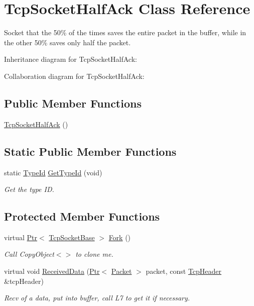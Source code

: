 \hypertarget{classTcpSocketHalfAck}{}\section{Tcp\+Socket\+Half\+Ack Class Reference}
\label{classTcpSocketHalfAck}


Socket that the 50\% of the times saves the entire packet in the buffer, while in the other 50\% saves only half the packet.  




Inheritance diagram for Tcp\+Socket\+Half\+Ack\+:


Collaboration diagram for Tcp\+Socket\+Half\+Ack\+:
\subsection*{Public Member Functions}
\begin{DoxyCompactItemize}
\item 
\hyperlink{classTcpSocketHalfAck_ae8504a66995a30f473d3049ad3cf8298}{Tcp\+Socket\+Half\+Ack} ()
\end{DoxyCompactItemize}
\subsection*{Static Public Member Functions}
\begin{DoxyCompactItemize}
\item 
static \hyperlink{classns3_1_1TypeId}{Type\+Id} \hyperlink{classTcpSocketHalfAck_a718d9cb58addc79c2018f768c4f464e9}{Get\+Type\+Id} (void)
\begin{DoxyCompactList}\small\item\em Get the type ID. \end{DoxyCompactList}\end{DoxyCompactItemize}
\subsection*{Protected Member Functions}
\begin{DoxyCompactItemize}
\item 
virtual \hyperlink{classns3_1_1Ptr}{Ptr}$<$ \hyperlink{classns3_1_1TcpSocketBase}{Tcp\+Socket\+Base} $>$ \hyperlink{classTcpSocketHalfAck_acae86abb1337213c04565efff8f239bd}{Fork} ()
\begin{DoxyCompactList}\small\item\em Call Copy\+Object$<$$>$ to clone me. \end{DoxyCompactList}\item 
virtual void \hyperlink{classTcpSocketHalfAck_af7e6040b891ce8b8abd0f774a366fa90}{Received\+Data} (\hyperlink{classns3_1_1Ptr}{Ptr}$<$ \hyperlink{classns3_1_1Packet}{Packet} $>$ packet, const \hyperlink{classns3_1_1TcpHeader}{Tcp\+Header} \&tcp\+Header)
\begin{DoxyCompactList}\small\item\em Recv of a data, put into buffer, call L7 to get it if necessary. \end{DoxyCompactList}\end{DoxyCompactItemize}
